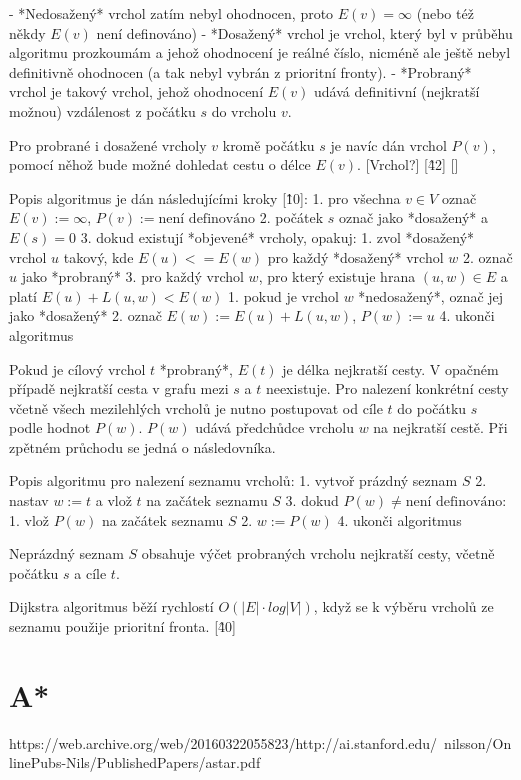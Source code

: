- *Nedosažený* vrchol zatím nebyl ohodnocen, proto $E(v) = \infty$ (nebo též někdy $E(v)$ není definováno)
- *Dosažený* vrchol je vrchol, který byl v průběhu algoritmu prozkoumám a jehož ohodnocení je reálné číslo, nicméně ale ještě nebyl definitivně ohodnocen (a tak nebyl vybrán z prioritní fronty).
- *Probraný* vrchol je takový vrchol, jehož ohodnocení $E(v)$ udává definitivní (nejkratší možnou) vzdálenost z počátku $s$ do vrcholu $v$. 

Pro probrané i dosažené vrcholy $v$ kromě počátku $s$ je navíc dán vrchol $P(v)$, pomocí něhož bude možné dohledat cestu o délce $E(v)$.  [Vrchol?] [\^42] []

Popis algoritmus je dán následujícími kroky \cite{mffDijkstraKucera} [\^10]:
1. pro všechna $v \in V$ označ $E(v) := \infty$, $P(v) := \text{není definováno}$ 
2. počátek $s$ označ jako *dosažený* a $E(s) = 0$
3. dokud existují *objevené* vrcholy, opakuj:
	1. zvol *dosažený* vrchol $u$ takový, kde $E(u) <= E(w)$ pro každý *dosažený* vrchol $w$
	2. označ $u$ jako *probraný*
	3. pro každý vrchol $w$, pro který existuje hrana  $(u,w) \in E$ a platí $E(u) + L(u,w) < E(w)$
		1. pokud je vrchol $w$ *nedosažený*, označ jej jako *dosažený*
		2. označ $E(w) := E(u) + L(u,w)$, $P(w) := u$
4. ukonči algoritmus

Pokud je cílový vrchol $t$ *probraný*, $E(t)$ je délka nejkratší cesty. V opačném případě nejkratší cesta v grafu mezi  $s$  a $t$ neexistuje. Pro nalezení konkrétní cesty včetně všech mezilehlých vrcholů je nutno postupovat od cíle $t$  do počátku $s$ podle hodnot $P(w)$. $P(w)$ udává předchůdce vrcholu $w$ na nejkratší cestě. Při zpětném průchodu se jedná o následovníka. 

Popis algoritmu pro nalezení seznamu vrcholů:
1. vytvoř prázdný seznam $S$
2. nastav $w := t$ a vlož $t$ na začátek seznamu $S$
3. dokud $P(w) \neq \text{není definováno}$:
	1. vlož $P(w)$ na začátek seznamu $S$
	2. $w := P(w)$
4. ukonči algoritmus

Neprázdný seznam $S$ obsahuje výčet probraných vrcholu nejkratší cesty, včetně počátku $s$ a cíle $t$. 

Dijkstra algoritmus běží rychlostí $O(|E|\cdot log|V|)$, když se k výběru vrcholů ze seznamu použije prioritní fronta. [\^40] 

\section{A*}
https://web.archive.org/web/20160322055823/http://ai.stanford.edu/~nilsson/OnlinePubs-Nils/PublishedPapers/astar.pdf

